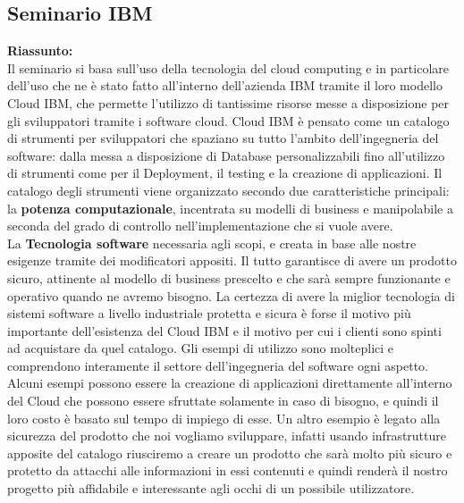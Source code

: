 \documentclass{article}
\begin{document}
\subsection{Seminario IBM}
\textbf{Riassunto:}
\\ Il seminario si basa sull'uso della tecnologia del cloud computing e  in particolare dell'uso che ne è stato fatto all'interno dell'azienda IBM tramite il loro modello Cloud IBM, che permette l'utilizzo di tantissime risorse messe a disposizione per gli sviluppatori tramite i software cloud. Cloud IBM è pensato come un catalogo di strumenti per sviluppatori che spaziano su tutto l'ambito dell'ingegneria del software: dalla messa a disposizione di Database personalizzabili fino all'utilizzo di strumenti come per il Deployment, il testing e la creazione di applicazioni. 
Il catalogo degli strumenti viene organizzato secondo due caratteristiche principali:\\
la \textbf{potenza computazionale}, incentrata su modelli di business e manipolabile a seconda del grado di controllo nell'implementazione che si vuole avere. \\
La \textbf{Tecnologia software} necessaria agli scopi, e creata in base alle nostre esigenze tramite dei modificatori appositi.
Il tutto garantisce di avere un prodotto sicuro, attinente al modello di business prescelto e che sarà sempre funzionante e operativo  quando ne  avremo bisogno.
La certezza di avere la miglior tecnologia di sistemi software a livello industriale protetta e sicura è forse il motivo più importante dell'esistenza del Cloud IBM e il motivo per cui i clienti sono spinti ad acquistare da quel catalogo.
Gli esempi di utilizzo sono molteplici e comprendono interamente il settore dell'ingegneria del software ogni aspetto.
Alcuni esempi possono essere la creazione di applicazioni direttamente all'interno del Cloud che possono essere sfruttate solamente in caso di bisogno, e quindi il loro costo è basato sul tempo di impiego di esse.
Un altro esempio è legato alla sicurezza del prodotto che noi vogliamo sviluppare, infatti usando infrastrutture apposite del catalogo riusciremo a creare un prodotto che sarà molto più sicuro e protetto da attacchi alle informazioni in essi contenuti e quindi renderà il nostro progetto più affidabile e interessante agli occhi di un possibile utilizzatore.
\end{document}
